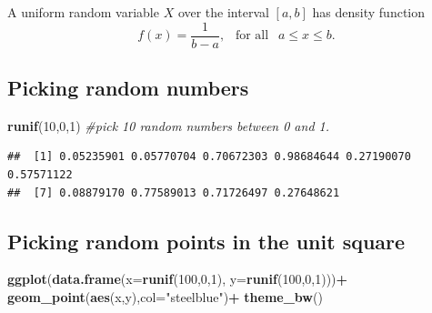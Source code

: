 \documentclass[
]{book}
\newenvironment{Shaded}{\begin{snugshade}}{\end{snugshade}}
\newcommand{\AttributeTok}[1]{\textcolor[rgb]{0.13,0.29,0.53}{#1}}
\newcommand{\CommentTok}[1]{\textcolor[rgb]{0.56,0.35,0.01}{\textit{#1}}}
\newcommand{\DecValTok}[1]{\textcolor[rgb]{0.00,0.00,0.81}{#1}}
\newcommand{\FunctionTok}[1]{\textcolor[rgb]{0.13,0.29,0.53}{\textbf{#1}}}
\newcommand{\NormalTok}[1]{#1}
\newcommand{\SpecialCharTok}[1]{\textcolor[rgb]{0.81,0.36,0.00}{\textbf{#1}}}
\newcommand{\StringTok}[1]{\textcolor[rgb]{0.31,0.60,0.02}{#1}}
\theoremstyle{definition}
\theoremstyle{definition}
\theoremstyle{definition}
\theoremstyle{definition}
\theoremstyle{remark}
\begin{document}
A uniform random variable \(X\) over the interval \([a,b]\) has density function \[f(x) = \frac{1}{b-a}, ~~\text{ for all }~~ a \leq x \leq b.\]

\subsection*{Picking random numbers}\label{picking-random-numbers}

\begin{Shaded}
\begin{Highlighting}[]
\FunctionTok{runif}\NormalTok{(}\DecValTok{10}\NormalTok{,}\DecValTok{0}\NormalTok{,}\DecValTok{1}\NormalTok{) }\CommentTok{\#pick 10 random numbers between 0 and 1.}
\end{Highlighting}
\end{Shaded}

\begin{verbatim}
##  [1] 0.05235901 0.05770704 0.70672303 0.98684644 0.27190070 0.57571122
##  [7] 0.08879170 0.77589013 0.71726497 0.27648621
\end{verbatim}

\subsection*{Picking random points in the unit square}\label{picking-random-points-in-the-unit-square}

\begin{Shaded}
\begin{Highlighting}[]
\FunctionTok{ggplot}\NormalTok{(}\FunctionTok{data.frame}\NormalTok{(}\AttributeTok{x=}\FunctionTok{runif}\NormalTok{(}\DecValTok{100}\NormalTok{,}\DecValTok{0}\NormalTok{,}\DecValTok{1}\NormalTok{),}
                 \AttributeTok{y=}\FunctionTok{runif}\NormalTok{(}\DecValTok{100}\NormalTok{,}\DecValTok{0}\NormalTok{,}\DecValTok{1}\NormalTok{)))}\SpecialCharTok{+}
  \FunctionTok{geom\_point}\NormalTok{(}\FunctionTok{aes}\NormalTok{(x,y),}\AttributeTok{col=}\StringTok{"steelblue"}\NormalTok{)}\SpecialCharTok{+}
  \FunctionTok{theme\_bw}\NormalTok{()}
\end{Highlighting}
\end{Shaded}
\end{document}
